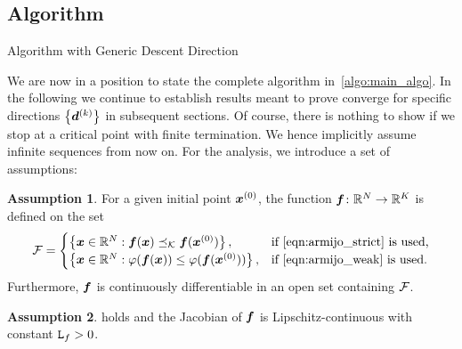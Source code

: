 \documentclass{article}
\theoremstyle{plain}
\theoremstyle{definition}
\newtheorem{assumption}{Assumption}
\begin{document}
\subsection{Algorithm}

\begin{algorithm}
	\caption{Algorithm with Generic Descent Direction}%
	\label{algo:main_algo}
\end{algorithm}

We are now in a position to state the complete algorithm
in~\cref{algo:main_algo}.
In the following we continue to establish results meant to prove converge
for specific directions $\left\{\bm{d}^{(k)}\right\}$ in subsequent sections.
Of course, there is nothing to show if we stop at a critical point 
with finite termination.
We hence implicitly assume infinite sequences from now on.
For the analysis, we introduce a set of assumptions:
	
\begin{assumption}\label{ass:funcs_differentiable}
	For a given initial point $\bm{x}^{(0)}$, the function 
	$\bm{f}\colon \mathbb R^N \to \mathbb R^K$ is defined on the set
	$$
	\mathcal F =
	\begin{cases}
		\left\{
			\bm{x} \in \mathbb R^N: \bm{f}(\bm{x}) \preceq_\mathcal K \bm{f}(\bm{x}^{(0)})
		\right\},
		&\text{if~\eqref{eqn:armijo_strict} is used,}
		\\
		\left\{
			\bm{x} \in \mathbb R^N: \varphi(\bm{f}(\bm{x})) \leq \varphi(\bm{f}(\bm{x}^{(0)}))
		\right\},
		&\text{if~\eqref{eqn:armijo_weak} is used.}
	\end{cases}
	$$
	Furthermore, $\bm{f}$ is continuously differentiable in an open set 
	containing $\mathcal F$.
\end{assumption}

\begin{assumption}\label{ass:func_grads_lipschitz}
	 holds and the Jacobian of $\bm{f}$ is Lipschitz-continuous
	with constant $\mathtt{L}_{f} > 0$.
\end{assumption}
\end{document}
